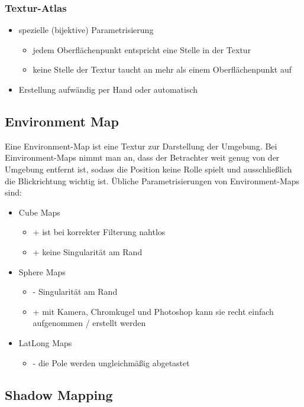 \documentclass[paper=a4, fontsize=11pt]{scrartcl} %
\numberwithin{equation}{section} %
\numberwithin{figure}{section} %
\numberwithin{table}{section} %
\begin{document}
\subsubsection{Textur-Atlas}

\begin{itemize}
\item spezielle (bijektive) Parametrisierung
\begin{itemize}
\item jedem Oberflächenpunkt entspricht eine Stelle in der Textur
\item keine Stelle der Textur taucht an mehr als einem Oberflächenpunkt auf
\end{itemize}
\item Erstellung aufwändig per Hand oder automatisch
\end{itemize}

\subsection{Environment Map}

Eine Environment-Map ist eine Textur zur Darstellung der Umgebung. Bei Einvironment-Maps nimmt man an, dass der Betrachter weit genug von der Umgebung entfernt ist, sodass die Position keine Rolle spielt und ausschließlich die Blickrichtung wichtig ist. Übliche Parametrisierungen von Environment-Maps sind:
\begin{itemize}
\item Cube Maps
\begin{itemize}
\item + ist bei korrekter Filterung nahtlos
\item + keine Singularität am Rand
\end{itemize}
\item Sphere Maps
\begin{itemize}
\item - Singularität am Rand
\item + mit Kamera, Chromkugel und Photoshop kann sie recht einfach aufgenommen / erstellt werden
\end{itemize}
\item LatLong Maps
\begin{itemize}
\item - die Pole werden ungleichmäßig abgetastet
\end{itemize}
\end{itemize}

\subsection{Shadow Mapping}
\end{document}

